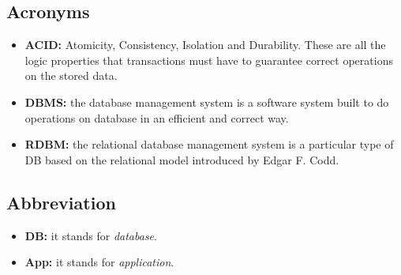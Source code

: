 \subsection{Acronyms}
\begin{itemize}
	\item \textbf{ACID:} Atomicity, Consistency, Isolation and Durability. These are all the logic properties that transactions must 			have to guarantee correct operations on the stored data.
	\item \textbf{DBMS:} the database management system is a software system built to do operations on database in an efficient 		and correct way.
	\item \textbf{RDBM:} the relational database management system is a particular type of DB based on the relational model 			introduced by Edgar F. Codd.
\end{itemize}

\subsection{Abbreviation}
\begin{itemize}
	\item \textbf{DB:} it stands for \textit{database}.
	\item \textbf{App:} it stands for \textit{application}.

\end{itemize}